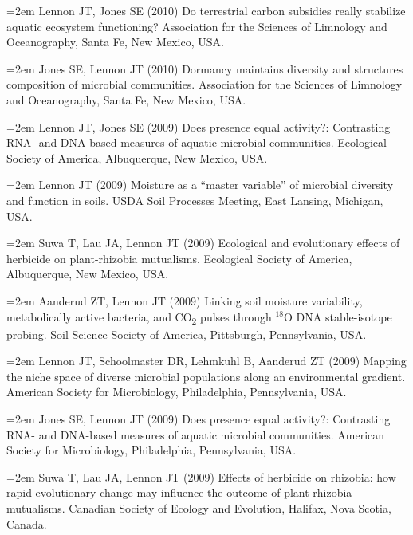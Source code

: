 \documentclass[11pt]{article}
\begin{document}
{\hangindent=2em Lennon JT, Jones SE (2010) Do terrestrial carbon subsidies really stabilize aquatic ecosystem functioning? Association for the Sciences of Limnology and Oceanography, Santa Fe, New Mexico, USA. \par

\hangindent=2em Jones SE, Lennon JT (2010) Dormancy maintains diversity and structures composition of microbial communities. Association for the Sciences of Limnology and Oceanography, Santa Fe, New Mexico, USA. \par

\hangindent=2em Lennon JT, Jones SE (2009) Does presence equal activity?: Contrasting RNA- and DNA-based measures of aquatic microbial communities. Ecological Society of America, Albuquerque, New Mexico, USA. \par

\hangindent=2em Lennon JT (2009) Moisture as a “master variable” of microbial diversity and function in soils. USDA Soil Processes Meeting, East Lansing, Michigan, USA. \par

\hangindent=2em Suwa T, Lau JA, Lennon JT (2009) Ecological and evolutionary effects of herbicide on plant-rhizobia mutualisms. Ecological Society of America, Albuquerque, New Mexico, USA. \par

\hangindent=2em Aanderud ZT, Lennon JT (2009) Linking soil moisture variability, metabolically active bacteria, and CO\textsubscript{2} pulses through \(^{18}\)O DNA stable-isotope probing. Soil Science Society of America, Pittsburgh, Pennsylvania, USA. \par

\hangindent=2em Lennon JT, Schoolmaster DR, Lehmkuhl B, Aanderud ZT (2009) Mapping the niche space of diverse microbial populations along an environmental gradient. American Society for Microbiology, Philadelphia, Pennsylvania, USA. \par

\hangindent=2em Jones SE, Lennon JT (2009) Does presence equal activity?: Contrasting RNA- and DNA-based measures of aquatic microbial communities. American Society for Microbiology, Philadelphia, Pennsylvania, USA. \par

\hangindent=2em Suwa T, Lau JA, Lennon JT (2009) Effects of herbicide on rhizobia: how rapid evolutionary change may influence the outcome of plant-rhizobia mutualisms. Canadian Society of Ecology and Evolution, Halifax, Nova Scotia, Canada. \par

}
\end{document}
